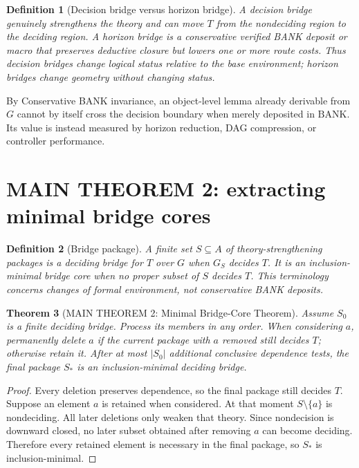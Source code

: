 \documentclass[11pt]{article}
\newtheorem{definition}{Definition}[section]
\newtheorem{theorem}[definition]{Theorem}
\theoremstyle{remark}
\newcommand{\BANK}{\ensuremath{\mathrm{BANK}}}
\begin{document}
\begin{definition}[Decision bridge versus horizon bridge]
A \emph{decision bridge} genuinely strengthens the theory and can move $T$ from the nondeciding region to the deciding region. A \emph{horizon bridge} is a conservative verified BANK deposit or macro that preserves deductive closure but lowers one or more route costs. Thus decision bridges change logical status relative to the base environment; horizon bridges change geometry without changing status.
\end{definition}

By Conservative BANK invariance, an object-level lemma already derivable from $G$ cannot by itself cross the decision boundary when merely deposited in \BANK. Its value is instead measured by horizon reduction, DAG compression, or controller performance.

\section{MAIN THEOREM 2: extracting minimal bridge cores}

\begin{definition}[Bridge package]
A finite set $S\subseteq A$ of theory-strengthening packages is a \emph{deciding bridge} for $T$ over $G$ when $G_S$ decides $T$. It is an \emph{inclusion-minimal bridge core} when no proper subset of $S$ decides $T$. This terminology concerns changes of formal environment, not conservative BANK deposits.
\end{definition}

\begin{theorem}[MAIN THEOREM 2: Minimal Bridge-Core Theorem]
Assume $S_0$ is a finite deciding bridge. Process its members in any order. When considering $a$, permanently delete $a$ if the current package with $a$ removed still decides $T$; otherwise retain it. After at most $|S_0|$ additional conclusive dependence tests, the final package $S_*$ is an inclusion-minimal deciding bridge.
\end{theorem}

\begin{proof}
Every deletion preserves dependence, so the final package still decides $T$. Suppose an element $a$ is retained when considered. At that moment $S\setminus\{a\}$ is nondeciding. All later deletions only weaken that theory. Since nondecision is downward closed, no later subset obtained after removing $a$ can become deciding. Therefore every retained element is necessary in the final package, so $S_*$ is inclusion-minimal.
\end{proof}
\end{document}
